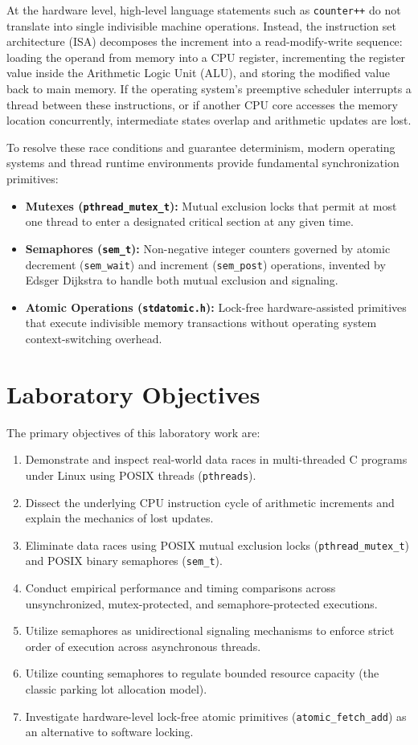 \documentclass[12pt,a4paper]{report}
\numberwithin{equation}{chapter}
\numberwithin{figure}{chapter}
\numberwithin{table}{chapter}
\begin{document}
At the hardware level, high-level language statements such as \texttt{counter++} do not translate into single indivisible machine operations. Instead, the instruction set architecture (ISA) decomposes the increment into a read-modify-write sequence: loading the operand from memory into a CPU register, incrementing the register value inside the Arithmetic Logic Unit (ALU), and storing the modified value back to main memory. If the operating system's preemptive scheduler interrupts a thread between these instructions, or if another CPU core accesses the memory location concurrently, intermediate states overlap and arithmetic updates are lost.

To resolve these race conditions and guarantee determinism, modern operating systems and thread runtime environments provide fundamental synchronization primitives:
\begin{itemize}
    \item \textbf{Mutexes (\texttt{pthread\_mutex\_t}):} Mutual exclusion locks that permit at most one thread to enter a designated critical section at any given time.
    \item \textbf{Semaphores (\texttt{sem\_t}):} Non-negative integer counters governed by atomic decrement (\texttt{sem\_wait}) and increment (\texttt{sem\_post}) operations, invented by Edsger Dijkstra to handle both mutual exclusion and signaling.
    \item \textbf{Atomic Operations (\texttt{stdatomic.h}):} Lock-free hardware-assisted primitives that execute indivisible memory transactions without operating system context-switching overhead.
\end{itemize}

\section{Laboratory Objectives}
The primary objectives of this laboratory work are:
\begin{enumerate}
    \item Demonstrate and inspect real-world data races in multi-threaded C programs under Linux using POSIX threads (\texttt{pthreads}).
    \item Dissect the underlying CPU instruction cycle of arithmetic increments and explain the mechanics of lost updates.
    \item Eliminate data races using POSIX mutual exclusion locks (\texttt{pthread\_mutex\_t}) and POSIX binary semaphores (\texttt{sem\_t}).
    \item Conduct empirical performance and timing comparisons across unsynchronized, mutex-protected, and semaphore-protected executions.
    \item Utilize semaphores as unidirectional signaling mechanisms to enforce strict order of execution across asynchronous threads.
    \item Utilize counting semaphores to regulate bounded resource capacity (the classic parking lot allocation model).
    \item Investigate hardware-level lock-free atomic primitives (\texttt{atomic\_fetch\_add}) as an alternative to software locking.
\end{enumerate}
\end{document}
